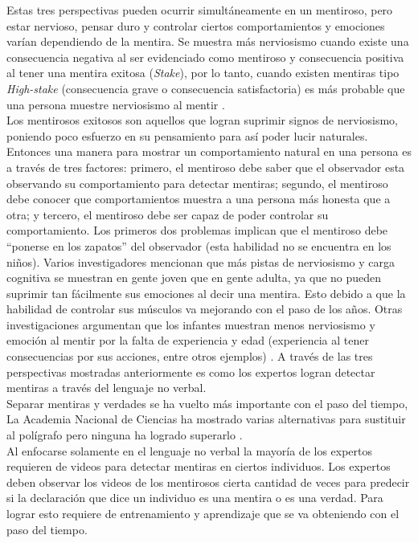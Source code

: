 \begin{onehalfspacing}
Estas tres perspectivas pueden ocurrir simultáneamente en un mentiroso, pero estar nervioso, pensar duro y controlar ciertos comportamientos y emociones varían dependiendo de la mentira. Se muestra más nerviosismo cuando existe una consecuencia negativa al ser evidenciado como mentiroso y consecuencia positiva al tener una mentira exitosa (\textit{Stake}), por lo tanto, cuando existen mentiras tipo \textit{High-stake} (consecuencia grave o consecuencia satisfactoria)  es más probable que una persona muestre nerviosismo al mentir \cite{Akehurst2004DetectingResearch}.\\

Los mentirosos exitosos son aquellos que logran suprimir signos de nerviosismo, poniendo poco esfuerzo en su pensamiento para así poder lucir naturales. Entonces una manera para mostrar un comportamiento natural en una persona es a través de tres factores: primero, el mentiroso debe saber que el observador esta observando su comportamiento para detectar mentiras; segundo, el mentiroso debe conocer que comportamientos muestra a una persona más honesta que a otra; y tercero, el mentiroso debe ser capaz de poder controlar su comportamiento. Los primeros dos problemas implican que el mentiroso debe “ponerse en los zapatos” del observador (esta habilidad no se encuentra en los niños). Varios investigadores mencionan que más pistas de nerviosismo y carga cognitiva se muestran en gente joven que en gente adulta, ya que no pueden suprimir tan fácilmente sus emociones al decir una mentira. Esto debido a que la habilidad de controlar sus músculos va mejorando con el paso de los años. Otras investigaciones argumentan que los infantes muestran menos nerviosismo y emoción al mentir por la falta de experiencia y edad (experiencia al tener consecuencias por sus acciones, entre otros ejemplos) \cite{Akehurst2004DetectingResearch}. A través de las tres perspectivas mostradas anteriormente es como los expertos logran detectar mentiras a través del lenguaje no verbal.\\

Separar mentiras y verdades se ha vuelto más importante con el paso del tiempo, La Academia Nacional de Ciencias ha mostrado varias alternativas para sustituir al polígrafo pero ninguna ha logrado superarlo \cite{Staunton2011AnExamination}.\\

Al enfocarse solamente en el lenguaje no verbal la mayoría de los expertos requieren de videos para detectar mentiras en ciertos individuos. Los expertos deben observar los videos de los mentirosos cierta cantidad de veces para predecir si la declaración que dice un individuo es una mentira o es una verdad. Para lograr esto requiere de entrenamiento y aprendizaje que se va obteniendo con el paso del tiempo. \\


\end{onehalfspacing}
